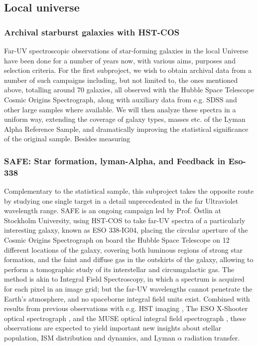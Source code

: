 \documentclass[12pt, a4paper]{scrartcl}
\begin{document}
\subsection*{Local universe}

\subsubsection*{Archival starburst galaxies with HST-COS}
Far-UV spectroscopic observations of star-forming galaxies in the local Universe
have been done for a number of years now, with various aims, purposes and
selection criteria\citep[e.g.][]{Heckman2011,Heckman2015,Alexandroff2015,
Wofford2013,Henry2015, RiveraThorsen2015}. For the first subproject, we wish to 
obtain archival data from a number of such campaigns including, but not limited
to, the ones mentioned above, totalling around 70 galaxies, all observed with
the Hubble Space Telescope Cosmic Origins Spectrograph, along with auxiliary
data from e.g. SDSS and other large samples where available. We will then analyze
these spectra in a uniform way, extending the coverage of galaxy types, masses
etc. of the Lyman Alpha Reference Sample, and dramatically improving the
statistical significance of the original sample. Besides measuring

\subsubsection*{SAFE: Star formation, lyman-Alpha, and Feedback in Eso-338}

Complementary to the statistical sample, this subproject takes the opposite
route by studying one single target in a detail unprecedented in the far
Ultraviolet wavelength range. 
SAFE is an ongoing campaign led by Prof. Östlin at Stockholm University, using
HST-COS to take far-UV spectra of a particularly interesting galaxy, known as
ESO 338-IG04, placing the circular aperture of the Cosmic Origins Spectrograph
on board the Hubble Space Telescope on 12 different locations of the galaxy,
covering both luminous regions of strong star formation, and the faint and
diffuse gas in the outskirts of the galaxy, allowing to perform a tomographic
study of its interstellar and circumgalactic gas. The method is akin to Integral
Field Spectroscopy, in which a spectrum is acquired for each pixel in an image
grid; but the far-UV wavelengths cannot penetrate the Earth's atmosphere, and no
spaceborne integral field units exist. Combined with results from previous
observations with e.g. HST imaging \citep{Hayes2009,Ostlin2009, Ostlin1998}, The
ESO X-Shooter optical spectrograph \cite[Rivera-Thorsen et al., submitted to
ApJ]{Guseva2012,Sandberg2013}, and the MUSE optical integral field spectrograph
\citep{Bik2015}, these observations are expected to yield important new insights
about stellar population, ISM distribution and dynamics, and Lyman $\alpha$
radiation transfer. 
\end{document}
